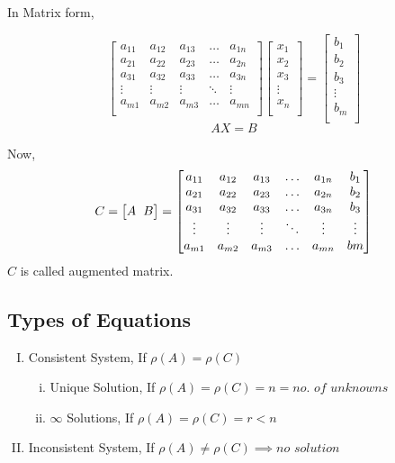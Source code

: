 \documentclass{article}
\begin{document}
In Matrix form,

$$\begin{bmatrix}
        a_{11} & a_{12} & a_{13} & \ldots & a_{1n} \\
        a_{21} & a_{22} & a_{23} & \ldots & a_{2n} \\
        a_{31} & a_{32} & a_{33} & \ldots & a_{3n} \\
        \vdots & \vdots & \vdots & \ddots & \vdots \\
        a_{m1} & a_{m2} & a_{m3} & \ldots & a_{mn} \\
    \end{bmatrix} \begin{bmatrix}
        x_{1}  \\
        x_{2}  \\
        x_{3}  \\
        \vdots \\
        x_{n}  \\
    \end{bmatrix}=\begin{bmatrix}
        b_{1}  \\
        b_{2}  \\
        b_{3}  \\
        \vdots \\
        b_{m}  \\
    \end{bmatrix}$$
$$AX=B$$

Now, $$C=\begin{bmatrix}
        A \hspace{2mm} B
    \end{bmatrix}=\begin{bmatrix}
        a_{11} & a_{12} & a_{13} & \ldots & a_{1n} & b_{1}  \\
        a_{21} & a_{22} & a_{23} & \ldots & a_{2n} & b_{2}  \\
        a_{31} & a_{32} & a_{33} & \ldots & a_{3n} & b_{3}  \\
        \vdots & \vdots & \vdots & \ddots & \vdots & \vdots \\
        a_{m1} & a_{m2} & a_{m3} & \ldots & a_{mn} & bm     \\
    \end{bmatrix}$$
$C$ is called augmented matrix.

\subsection{Types of Equations}
\begin{enumerate}[I.]
    \item Consistent System, If $\rho(A)=\rho(C)$
          \begin{enumerate}[i.]
              \item Unique Solution, If $\rho(A)=\rho(C)=n=\textit{no. of unknowns}$
              \item $\infty$ Solutions, If $\rho(A)=\rho(C)=r<n$
          \end{enumerate}
    \item Inconsistent System, If $\rho(A)\not=\rho(C) \implies \textit{no solution}$
\end{enumerate}
\end{document}
